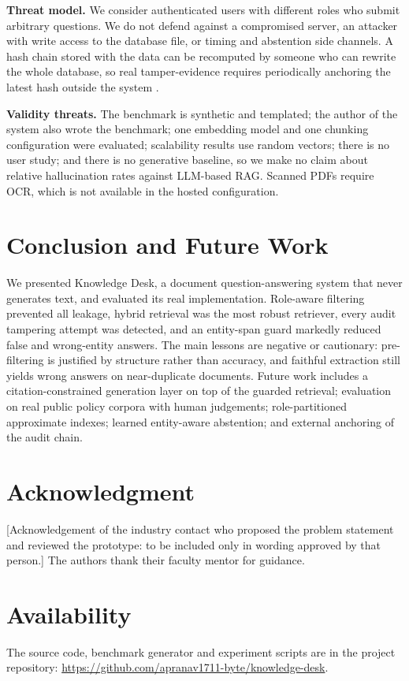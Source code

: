 \documentclass[journal]{IEEEtran}
\begin{document}
\textbf{Threat model.} We consider authenticated users with different roles who submit arbitrary questions. We do not defend against a compromised server, an attacker with write access to the database file, or timing and abstention side channels. A hash chain stored with the data can be recomputed by someone who can rewrite the whole database, so real tamper-evidence requires periodically anchoring the latest hash outside the system \cite{crosby2009tamper}.

\textbf{Validity threats.} The benchmark is synthetic and templated; the author of the system also wrote the benchmark; one embedding model and one chunking configuration were evaluated; scalability results use random vectors; there is no user study; and there is no generative baseline, so we make no claim about relative hallucination rates against LLM-based RAG. Scanned PDFs require OCR, which is not available in the hosted configuration.

\section{Conclusion and Future Work}
We presented Knowledge Desk, a document question-answering system that never generates text, and evaluated its real implementation. Role-aware filtering prevented all leakage, hybrid retrieval was the most robust retriever, every audit tampering attempt was detected, and an entity-span guard markedly reduced false and wrong-entity answers. The main lessons are negative or cautionary: pre-filtering is justified by structure rather than accuracy, and faithful extraction still yields wrong answers on near-duplicate documents. Future work includes a citation-constrained generation layer on top of the guarded retrieval; evaluation on real public policy corpora with human judgements; role-partitioned approximate indexes; learned entity-aware abstention; and external anchoring of the audit chain.

\section*{Acknowledgment}
[Acknowledgement of the industry contact who proposed the problem statement and reviewed the prototype: to be included only in wording approved by that person.] The authors thank their faculty mentor for guidance.

\section*{Availability}
The source code, benchmark generator and experiment scripts are in the project repository: \url{https://github.com/apranav1711-byte/knowledge-desk}.



\end{document}
